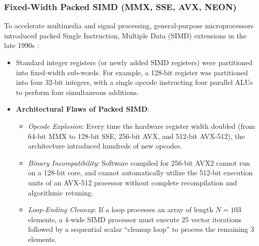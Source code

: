 \subsubsection{Fixed-Width Packed SIMD (MMX, SSE, AVX, NEON)}
To accelerate multimedia and signal processing, general-purpose microprocessors introduced packed Single Instruction, Multiple Data (SIMD) extensions in the late 1990s \cite{conte1996simd, firasta2008intel}:
\begin{itemize}
    \item Standard integer registers (or newly added SIMD registers) were partitioned into fixed-width sub-words. For example, a 128-bit register was partitioned into four 32-bit integers, with a single opcode instructing four parallel ALUs to perform four simultaneous additions.
    \item \textbf{Architectural Flaws of Packed SIMD}:
    \begin{itemize}
        \item \emph{Opcode Explosion}: Every time the hardware register width doubled (from 64-bit MMX to 128-bit SSE, 256-bit AVX, and 512-bit AVX-512), the architecture introduced hundreds of new opcodes.
        \item \emph{Binary Incompatibility}: Software compiled for 256-bit AVX2 cannot run on a 128-bit core, and cannot automatically utilize the 512-bit execution units of an AVX-512 processor without complete recompilation and algorithmic retuning.
        \item \emph{Loop-Ending Cleanup}: If a loop processes an array of length $N = 103$ elements, a 4-wide SIMD processor must execute 25 vector iterations followed by a sequential scalar ``cleanup loop'' to process the remaining 3 elements.
    \end{itemize}
\end{itemize}

